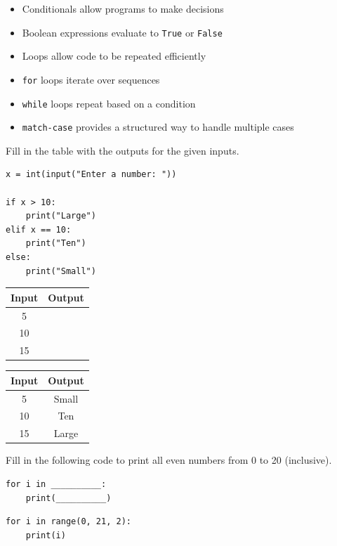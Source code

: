 \begin{itemize}
    \item Conditionals allow programs to make decisions
    \item Boolean expressions evaluate to \texttt{True} or \texttt{False}
    \item Loops allow code to be repeated efficiently
    \item \texttt{for} loops iterate over sequences
    \item \texttt{while} loops repeat based on a condition
    \item \texttt{match-case} provides a structured way to handle multiple cases
\end{itemize}
\begin{Exercise}[label=conditionals1, title=Predict the Output]
Fill in the table with the outputs for the given inputs.
\begin{verbatim}
x = int(input("Enter a number: "))

if x > 10:
    print("Large")
elif x == 10:
    print("Ten")
else:
    print("Small")
\end{verbatim}
\begin{tabular}{|c|c|}
\hline
Input & Output \\
\hline
5 & \\
\hline
10 & \\
\hline
15 & \\
\hline
\end{tabular}
\end{Exercise}
\begin{Answer}[ref=conditionals1]
\begin{tabular}{|c|c|}
\hline
Input & Output \\
\hline
5 & Small \\
\hline
10 & Ten \\
\hline
15 & Large \\
\hline
\end{tabular}
\end{Answer}

\begin{Exercise}[label=loops1, title=Fill in the Blanks: Loop Edition]
Fill in the following code to print all even numbers from 0 to 20 (inclusive).
\begin{verbatim}
for i in __________:
    print(__________)
\end{verbatim}
\end{Exercise}
\begin{Answer}[ref=loops1]
\begin{verbatim}
for i in range(0, 21, 2):
    print(i)
\end{verbatim}
\end{Answer}

